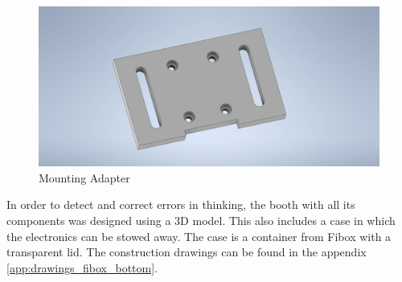 \begin{figure}[h]
	\centering
	\includegraphics[scale=0.2]{graphics/mounting_adapter.png}
	\caption{Mounting Adapter}
	\label{fig:mounting_adapter}
\end{figure}

In order to detect and correct errors in thinking, the booth with all its components was designed using a 3D model.
This also includes a case in which the electronics can be stowed away.
The case is a container from Fibox with a transparent lid.
The construction drawings can be found in the appendix \ref{app:drawings_fibox_bottom}.





